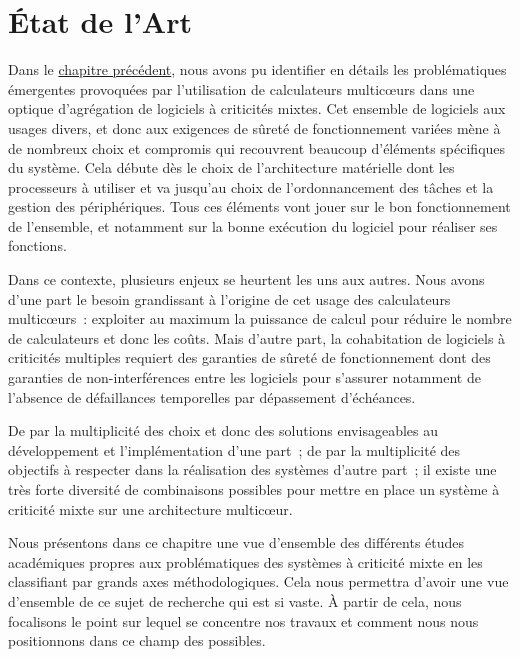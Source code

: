 \documentclass[french, a4paper, 11pt, twoside, pdftex]{StyleThese}
\begin{document}
\setcounter{chapter}{2} %
\dominitoc
\faketableofcontents
\fi

\chapter{État de l'Art} \label{chap:2_StateofArt}
\minitoc

Dans le \hyperref[chap:1_EnjeuxIntro]{chapitre précédent}, nous avons pu identifier en détails les problématiques émergentes provoquées par l'utilisation de calculateurs multicœurs dans une optique d'agrégation de logiciels à criticités mixtes. Cet ensemble de logiciels aux usages divers, et donc aux exigences de sûreté de fonctionnement variées mène à de nombreux choix et compromis qui recouvrent beaucoup d'éléments spécifiques du système. Cela débute dès le choix de l'architecture matérielle dont les processeurs à utiliser et va jusqu'au choix de l'ordonnancement des tâches et la gestion des périphériques. Tous ces éléments vont jouer sur le bon fonctionnement de l'ensemble, et notamment sur la bonne exécution du logiciel pour réaliser ses fonctions.

Dans ce contexte, plusieurs enjeux se heurtent les uns aux autres. Nous avons d'une part le besoin grandissant à l'origine de cet usage des calculateurs multicœurs~: exploiter au maximum la puissance de calcul pour réduire le nombre de calculateurs et donc les coûts. Mais d'autre part, la cohabitation de logiciels à criticités multiples requiert des garanties de sûreté de fonctionnement dont des garanties de non-interférences entre les logiciels pour s'assurer notamment de l'absence de défaillances temporelles par dépassement d'échéances.

De par la multiplicité des choix et donc des solutions envisageables au développement et l'implémentation d'une part~; de par la multiplicité des objectifs à respecter dans la réalisation des systèmes d'autre part~; il existe une très forte diversité de combinaisons possibles pour mettre en place un système à criticité mixte sur une architecture multicœur.

Nous présentons dans ce chapitre une vue d'ensemble des différents études académiques propres aux problématiques des systèmes à criticité mixte en les classifiant par grands axes méthodologiques. Cela nous permettra d'avoir une vue d'ensemble de ce sujet de recherche qui est si vaste. À partir de cela, nous focalisons le point sur lequel se concentre nos travaux et comment nous nous positionnons dans ce champ des possibles.
\end{document}
